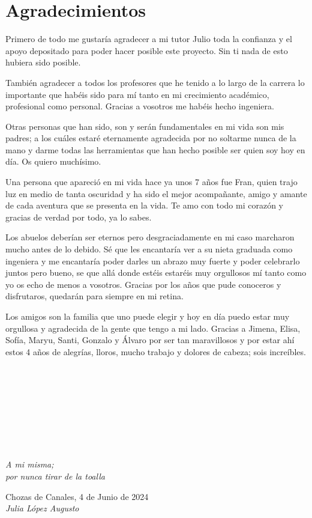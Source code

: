\cleardoublepage

\chapter*{Agradecimientos}

Primero de todo me gustaría agradecer a mi tutor Julio toda la confianza y el apoyo depositado para poder hacer posible este proyecto. Sin ti nada de esto hubiera sido posible.

También agradecer a todos los profesores que he tenido a lo largo de la carrera lo importante que habéis sido para mí tanto en mi crecimiento académico, profesional como personal. Gracias a vosotros me habéis hecho ingeniera.

Otras personas que han sido, son y serán fundamentales en mi vida son mis padres; a los cuáles estaré eternamente agradecida por no soltarme nunca de la mano y darme todas las herramientas que han hecho posible ser quien soy hoy en día. Os quiero muchísimo.

Una persona que apareció en mi vida hace ya unos 7 años fue Fran, quien trajo luz en medio de tanta oscuridad y ha sido el mejor acompañante, amigo y amante de cada aventura que se presenta en la vida. Te amo con todo mi corazón y gracias de verdad por todo, ya lo sabes.

Los abuelos deberían ser eternos pero desgraciadamente en mi caso marcharon mucho antes de lo debido. Sé que les encantaría ver a su nieta graduada como ingeniera y me encantaría poder darles un abrazo muy fuerte y poder celebrarlo juntos pero bueno, se que allá donde estéis estaréis muy orgullosos mí tanto como yo os echo de menos a vosotros. Gracias por los años que pude conoceros y disfrutaros, quedarán para siempre en mi retina. 

Los amigos son la familia que uno puede elegir y hoy en día puedo estar muy orgullosa y agradecida de la gente que tengo a mi lado. Gracias a Jimena, Elisa, Sofía, Maryu, Santi, Gonzalo y Álvaro por ser tan maravillosos y por estar ahí estos 4 años de alegrías, lloros, mucho trabajo y dolores de cabeza; sois increíbles.\\
\ %

\

\

\

\

\begin{flushright}
		\vspace{4.0 cm}
		\emph{A mi misma;\\
      por nunca tirar de la toalla}\\
		\par
		\vspace{1.0 cm}
		Chozas de Canales, 4 de Junio de 2024\\ %
		\emph{Julia López Augusto}
\end{flushright}

\thispagestyle{empty}

